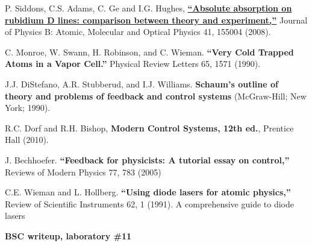 \documentclass{../lab}
\begin{document}
\begin{thebibliography}{}
     P. Siddons, C.S. Adams, C. Ge and I.G. Hughes, \href{https://arxiv.org/pdf/0805.1139}{\textbf{``Absolute absorption on rubidium D lines: comparison between theory and experiment,''}} Journal of Physics B: Atomic, Molecular and Optical Physics 41, 155004 (2008).

     C. Monroe, W. Swann, H. Robinson, and C. Wieman. \textbf{``Very Cold Trapped Atoms in a Vapor Cell.''} Physical Review Letters 65, 1571 (1990).

     J.J. DiStefano, A.R. Stubberud, and I.J. Williams. \textbf{Schaum’s outline of theory and problems of feedback and control systems} (McGraw-Hill; New York; 1990).

     R.C. Dorf and R.H. Bishop, \textbf{Modern Control Systems, 12th ed.}, Prentice Hall (2010).

     J. Bechhoefer. \textbf{``Feedback for physicists: A tutorial essay on control,''} Reviews of Modern Physics 77, 783 (2005)

     C.E. Wieman and L. Hollberg. \textbf{``Using diode lasers for atomic physics,''} Review of Scientific Instruments 62, 1 (1991). A comprehensive guide to diode lasers

     \textbf{BSC writeup, laboratory \#11}


\end{thebibliography}
\end{document}
